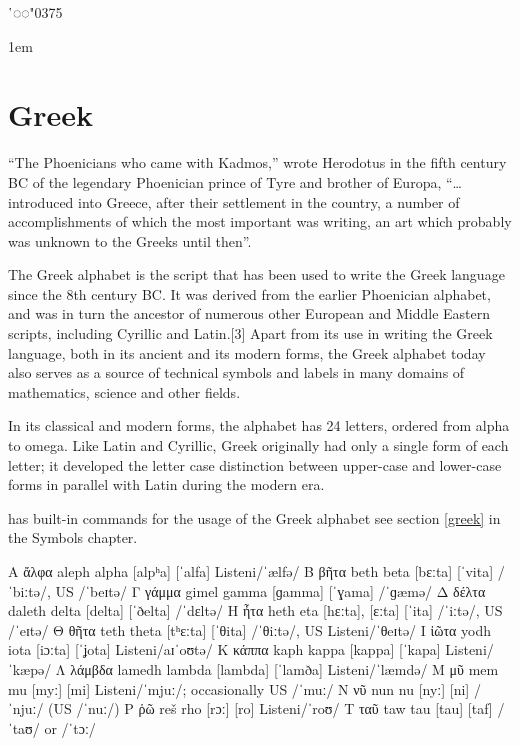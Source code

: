 \def\diacritic#1{{#1\LARGE ῾◌◌\char"0375}}
\newfontfamily{}
\def\greektext#1{\greek{#1}}
\diacritic{\greek}

\parindent1em

\section{Greek}

``The Phoenicians who came with Kadmos,'' wrote Herodotus in the fifth century BC of the legendary Phoenician prince of Tyre and brother of Europa, ``\ldots introduced into Greece, after their settlement in the country, a number of accomplishments of which the most important was writing, an art which probably was unknown to the Greeks until then''. 

The Greek alphabet is the script that has been used to write the Greek language since the 8th century BC. It was derived from the earlier Phoenician alphabet, and was in turn the ancestor of numerous other European and Middle Eastern scripts, including Cyrillic and Latin.[3] Apart from its use in writing the Greek language, both in its ancient and its modern forms, the Greek alphabet today also serves as a source of technical symbols and labels in many domains of mathematics, science and other fields.

In its classical and modern forms, the alphabet has 24 letters, ordered from alpha to omega. Like Latin and Cyrillic, Greek originally had only a single form of each letter; it developed the letter case distinction between upper-case and lower-case forms in parallel with Latin during the modern era.

\tex has built-in commands for the usage of the Greek alphabet see section \ref{greek} in the Symbols chapter.

\bgroup
\obeylines
\greek\obeyspaces

Α	ἄλφα	aleph	alpha	[alpʰa]	[ˈalfa]	Listeni/ˈælfə/
Β	βῆτα	beth	beta	[bɛːta]	[ˈvita]	/ˈbiːtə/, US /ˈbeɪtə/
Γ	γάμμα	gimel	gamma	[ɡamma]	[ˈɣama]	/ˈɡæmə/
Δ	δέλτα	daleth	delta	[delta]	[ˈðelta]	/ˈdɛltə/
Η	ἦτα	  heth	   eta	 [hɛːta], [ɛːta]	[ˈita]	/ˈiːtə/, US /ˈeɪtə/
Θ	θῆτα	teth	theta	[tʰɛːta]	[ˈθita]	/ˈθiːtə/, US Listeni/ˈθeɪtə/
Ι	ἰῶτα	yodh	iota	[iɔːta]	[ˈʝota]	Listeni/aɪˈoʊtə/
Κ	κάππα	kaph	kappa	[kappa]	[ˈkapa]	Listeni/ˈkæpə/
Λ	λάμβδα	lamedh	lambda	[lambda]	[ˈlamða]	Listeni/ˈlæmdə/
Μ	μῦ	mem	mu	[myː]	[mi]	Listeni/ˈmjuː/; occasionally US /ˈmuː/
Ν	νῦ	nun	nu	[nyː]	[ni]	/ˈnjuː/ (US /ˈnuː/)
Ρ	ῥῶ	reš	rho	[rɔː]	[ro]	Listeni/ˈroʊ/
Τ	ταῦ	taw	tau	[tau]	[taf]	/ˈtaʊ/ or /ˈtɔː/
\egroup

